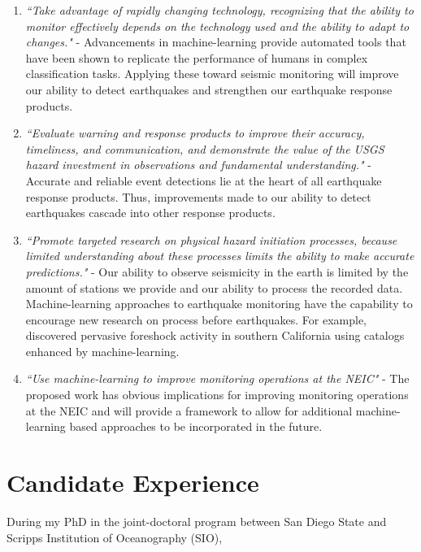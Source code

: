 \documentclass[12p]{article}
\begin{document}
\begin{enumerate}
  \item \emph{``Take advantage of rapidly changing technology, recognizing that the ability to monitor effectively
  depends on the technology used and the ability to adapt to changes."} - Advancements in machine-learning provide
  automated tools that have been shown to replicate the performance of humans in complex classification tasks. Applying
  these toward seismic monitoring will improve our ability to detect earthquakes and strengthen our earthquake response
  products.

  \item \emph{``Evaluate warning and response products to improve their accuracy, timeliness, and communication, and
  demonstrate the value of the USGS hazard investment in observations and fundamental understanding."} - Accurate and
  reliable event detections lie at the heart of all earthquake response products. Thus, improvements made to our ability
  to detect earthquakes cascade into other response products.

  \item \emph{``Promote targeted research on physical hazard initiation processes, because limited understanding about
  these processes limits the ability to make accurate predictions."} - Our ability to observe seismicity in the earth is
  limited by the amount of stations we provide and our ability to process the recorded data. Machine-learning approaches
  to earthquake monitoring have the capability to encourage new research on process before earthquakes. For example,
  \citet{Trugman2019} discovered pervasive foreshock activity in southern California using catalogs enhanced by
  machine-learning.

  \item \emph{``Use machine-learning to improve monitoring operations at the NEIC"} - The proposed work has obvious
  implications for improving monitoring operations at the NEIC and will provide a framework to allow for additional
  machine-learning based approaches to be incorporated in the future.
\end{enumerate}

\section{Candidate Experience}

During my PhD in the joint-doctoral program between San Diego State and Scripps Institution of Oceanography (SIO),
\end{document}
